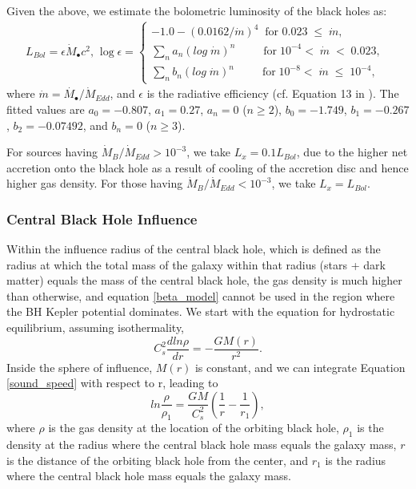 \documentclass[fleqn,usenatbib,useAMS]{mnras}
\begin{document}
Given the above, we estimate the bolometric luminosity of the black holes as:
\begin{subequations}
    \begin{equation}\label{bol_lum}
        L_{Bol} = \epsilon\dot{M}_{\bullet}c^2,
    \end{equation}
    \begin{equation}\label{rad_eff}
        \begin{split}
        \text{log}\;\epsilon = \begin{cases}
                        -1.0-(0.0162/\dot{m})^{4}\;\;\text{for 0.023}\;\leq\;\dot{m}, \\
                        \sum_{n}{}a_{n}(log\;\dot{m})^{n}\;\;\;\;\;\;\;\;\;\text{for}\;10^{-4} <\;\dot{m}\;<\;0.023, \\
                        \sum_{n}{}b_{n}(log\;\dot{m})^{n}\;\;\;\;\;\;\;\;\;\text{for}\;10^{-8} <\;\dot{m}\;\leq\;10^{-4},
                               \end{cases}
        \end{split}
    \end{equation}
\end{subequations}
where $\dot{m}=\dot{M_{\bullet}}/\dot{M}_{Edd}$, and $\epsilon$ is the radiative efficiency (cf. Equation 13 in \citealt{2019MNRAS.486.5377I}).  The fitted values are $a_0=-0.807$, $a_1=0.27$, $a_n=0$ ($n\geq2$), $b_0=-1.749$, $b_1=-0.267$, $b_2=-0.07492$, and $b_n=0$ ($n\geq3$).

For sources having $\dot{M}_B/\dot{M}_{Edd} > 10^{-3}$, we take $L_x=0.1L_{Bol}$, due to the higher net accretion onto the black hole as a result of cooling of the accretion disc and hence higher gas density.  For those having $\dot{M}_B/\dot{M}_{Edd} < 10^{-3}$, we take $L_x=L_{Bol}$.


\subsubsection{Central Black Hole Influence}
Within the influence radius of the central black hole, which is defined as the radius at which the total mass of the galaxy within that radius (stars + dark matter) equals the mass of the central black hole, the gas density is much higher than otherwise, and equation \eqref{beta_model} cannot be used in the region where the BH Kepler potential dominates.  We start with the equation for hydrostatic equilibrium, assuming isothermality,
\begin{equation} \label{sound_speed}
    C_{s}^2\frac{dln\rho}{dr}= -\frac{GM(r)}{r^2}.
\end{equation}
Inside the sphere of influence, $M(r)$ is constant, and we can integrate Equation \eqref{sound_speed} with respect to r, leading to 
\begin{equation}
    ln\frac{\rho}{\rho_1} = \frac{GM}{C_{s}^2}\left(\frac{1}{r} - \frac{1}{r_1}\right),
\end{equation}
where $\rho$ is the gas density at the location of the orbiting black hole, $\rho_1$ is the density at the radius where the central black hole mass equals the galaxy mass, $r$ is the distance of the orbiting black hole from the center, and $r_1$ is the radius where the central black hole mass equals the galaxy mass.
\end{document}
